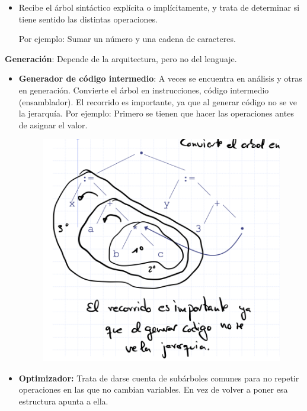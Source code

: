 \documentclass[12pt, twoside, openright]{report} %
\begin{document}
\begin{itemize}
    \begin{itemize}
    \item
      Recibe el árbol sintáctico explícita o implícitamente, y trata de
      determinar si tiene sentido las distintas operaciones.
    
      Por ejemplo: Sumar un número y una cadena de caracteres.
    \end{itemize}
\end{itemize}


\textbf{Generación}: Depende de la arquitectura, pero no del lenguaje.
\begin{itemize}
  \item \textbf{Generador de código intermedio}: A veces se encuentra en análisis y otras
  en generación. Convierte el árbol en instrucciones, código
  intermedio (ensamblador). El recorrido es importante, ya que al generar
  código no se ve la jerarquía. Por ejemplo: Primero se tienen que hacer
  las operaciones antes de asignar el valor.
  
  \begin{figure}[H]
    {\includegraphics[scale=.25]{Untitled 14.png}}
  \end{figure}
  
  \item \textbf{Optimizador:} Trata de darse cuenta de subárboles comunes para
  no repetir operaciones en las que no cambian variables. En vez de volver
  a poner esa estructura apunta a ella.
  

\end{itemize}
\end{document}
